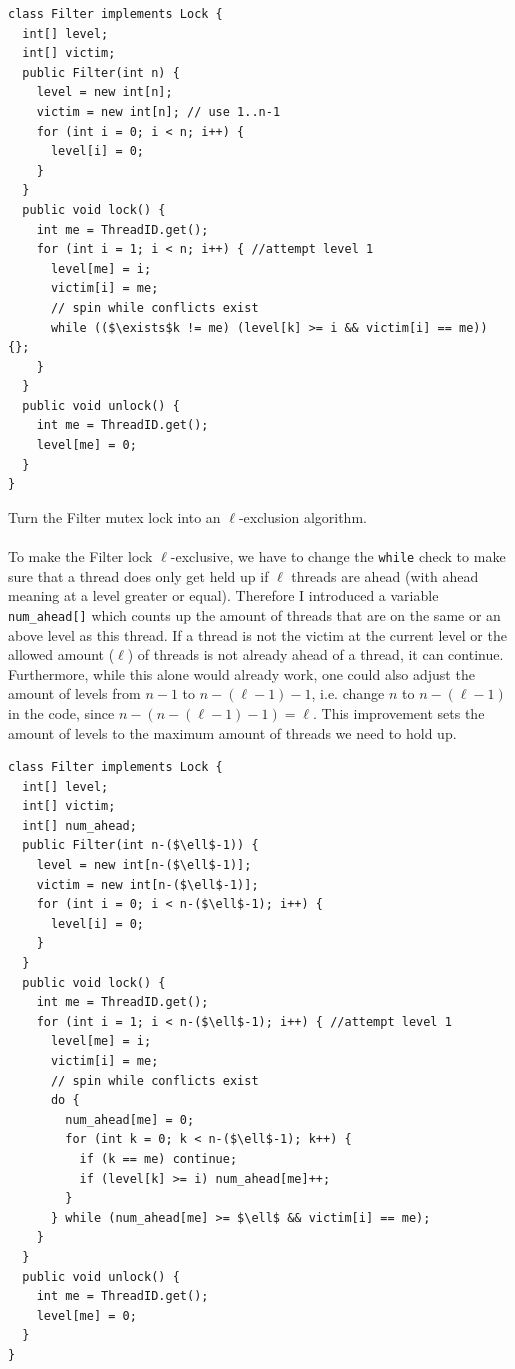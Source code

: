 \documentclass[a4paper,%
11pt,%
DIV=14,
headsepline,%
headings=normal,
]{scrartcl}
\begin{document}
\begin{lstlisting}[mathescape=true]
class Filter implements Lock {
  int[] level;
  int[] victim;
  public Filter(int n) {
    level = new int[n];
    victim = new int[n]; // use 1..n-1
    for (int i = 0; i < n; i++) {
      level[i] = 0;
    }
  }
  public void lock() {
    int me = ThreadID.get();
    for (int i = 1; i < n; i++) { //attempt level 1
      level[me] = i;
      victim[i] = me;
      // spin while conflicts exist
      while (($\exists$k != me) (level[k] >= i && victim[i] == me)) {};
    }
  }
  public void unlock() {
    int me = ThreadID.get();
    level[me] = 0;
  }
}
\end{lstlisting}
\medskip
Turn the Filter mutex lock into an $\ell$-exclusion algorithm.\\
\\
To make the Filter lock $\ell$-exclusive, we have to change the \texttt{while} check to make sure that a thread does only get held up if $\ell$ threads are ahead (with ahead meaning at a level greater or equal). Therefore I introduced a variable \texttt{num\_ahead[]} which counts up the amount of threads that are on the same or an above level as this thread. If a thread is not the victim at the current level or the allowed amount ($\ell$) of threads is not already ahead of a thread, it can continue. Furthermore, while this alone would already work, one could also adjust the amount of levels from $n-1$ to $n-(\ell-1)-1$, i.e. change $n$ to $n-(\ell-1)$ in the code, since $n - (n-(\ell - 1)-1) = \ell$. This improvement sets the amount of levels to the maximum amount of threads we need to hold up.

\begin{lstlisting}[mathescape=true]
class Filter implements Lock {
  int[] level;
  int[] victim;
  int[] num_ahead;
  public Filter(int n-($\ell$-1)) {
    level = new int[n-($\ell$-1)];
    victim = new int[n-($\ell$-1)];
    for (int i = 0; i < n-($\ell$-1); i++) {
      level[i] = 0;
    }
  }
  public void lock() {
    int me = ThreadID.get();
    for (int i = 1; i < n-($\ell$-1); i++) { //attempt level 1
      level[me] = i;
      victim[i] = me;
      // spin while conflicts exist
      do {
        num_ahead[me] = 0;
        for (int k = 0; k < n-($\ell$-1); k++) {
          if (k == me) continue;
          if (level[k] >= i) num_ahead[me]++;
        }
      } while (num_ahead[me] >= $\ell$ && victim[i] == me);
    }
  }
  public void unlock() {
    int me = ThreadID.get();
    level[me] = 0;
  }
}
\end{lstlisting}
\end{document}
